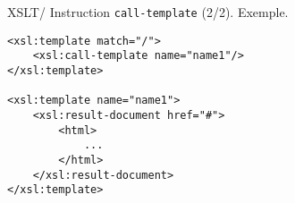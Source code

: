 \documentclass{beamer}
\begin{document}
    \begin{frame}[fragile]{XSLT/ Instruction \texttt{call-template} (2/2). Exemple.}
        \begin{verbatim}
<xsl:template match="/">
    <xsl:call-template name="name1"/>
</xsl:template>

<xsl:template name="name1">
    <xsl:result-document href="#">
        <html>
            ...
        </html>
    </xsl:result-document>
</xsl:template>
        \end{verbatim}
    \end{frame}
\end{document}
